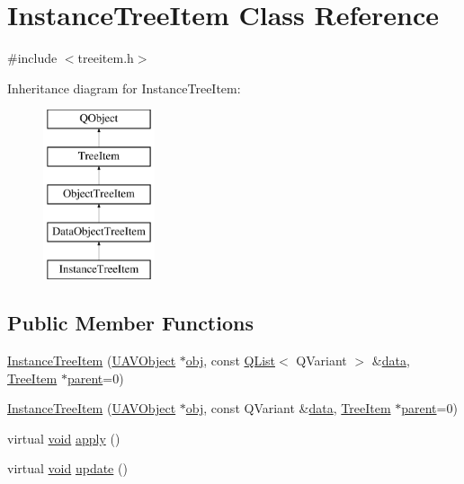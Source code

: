 \hypertarget{class_instance_tree_item}{\section{Instance\-Tree\-Item Class Reference}
\label{class_instance_tree_item}
}


{\ttfamily \#include $<$treeitem.\-h$>$}

Inheritance diagram for Instance\-Tree\-Item\-:\begin{figure}[H]
\begin{center}
\leavevmode
\includegraphics[height=5.000000cm]{class_instance_tree_item}
\end{center}
\end{figure}
\subsection*{Public Member Functions}
\begin{DoxyCompactItemize}
\item 
\hyperlink{group___u_a_v_object_browser_plugin_gabd66635c3e24281e23eada197638556f}{Instance\-Tree\-Item} (\hyperlink{class_u_a_v_object}{U\-A\-V\-Object} $\ast$\hyperlink{glext_8h_a0c0d4701a6c89f4f7f0640715d27ab26}{obj}, const \hyperlink{class_q_list}{Q\-List}$<$ Q\-Variant $>$ \&\hyperlink{glext_8h_a8850df0785e6fbcc2351af3b686b8c7a}{data}, \hyperlink{class_tree_item}{Tree\-Item} $\ast$\hyperlink{group___u_a_v_object_browser_plugin_gaa3a7ba624312b6be70872634db291881}{parent}=0)
\item 
\hyperlink{group___u_a_v_object_browser_plugin_ga1bcb15718988cc4a3a33c7ff85c7c00d}{Instance\-Tree\-Item} (\hyperlink{class_u_a_v_object}{U\-A\-V\-Object} $\ast$\hyperlink{glext_8h_a0c0d4701a6c89f4f7f0640715d27ab26}{obj}, const Q\-Variant \&\hyperlink{glext_8h_a8850df0785e6fbcc2351af3b686b8c7a}{data}, \hyperlink{class_tree_item}{Tree\-Item} $\ast$\hyperlink{group___u_a_v_object_browser_plugin_gaa3a7ba624312b6be70872634db291881}{parent}=0)
\item 
virtual \hyperlink{group___u_a_v_objects_plugin_ga444cf2ff3f0ecbe028adce838d373f5c}{void} \hyperlink{group___u_a_v_object_browser_plugin_gafd9da1af77e6f69ebd81764de23cc4c0}{apply} ()
\item 
virtual \hyperlink{group___u_a_v_objects_plugin_ga444cf2ff3f0ecbe028adce838d373f5c}{void} \hyperlink{group___u_a_v_object_browser_plugin_ga2f98ddf82fa4ee89c654de207ba2f551}{update} ()
\end{DoxyCompactItemize}

